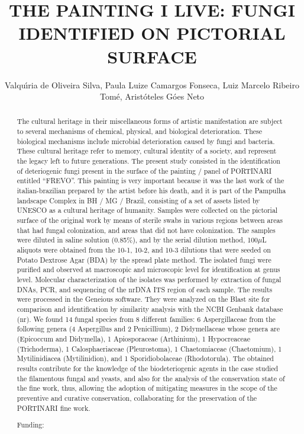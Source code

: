 \documentclass[twoside]{article}
\title{\vspace{-15mm}\fontsize{24pt}{10pt}\selectfont\textbf{ THE PAINTING I LIVE: FUNGI IDENTIFIED ON PICTORIAL SURFACE }} %
\author{ Valqu\'{\i}ria de Oliveira Silva, Paula Luize Camargos Fonseca, Luiz Marcelo Ribeiro Tom\'e, Arist\'oteles G\'oes Neto }
\affil{ Universidade Federal de Minas Gerais }
\date{}
\begin{document}
  
  
  \maketitle %
  
  
  \thispagestyle{fancy} %
  
  
  \begin{abstract}
  The cultural heritage in their miscellaneous  forms of artistic manifestation are subject to several mechanisms of chemical,  physical,  and biological deterioration. These biological mechanisms include microbial deterioration caused by fungi and bacteria. These cultural heritage refer to memory,  cultural identity of a society,  and represent the legacy left to future generations. The present study consisted in the identification of deteriogenic fungi present in the surface of the painting / panel of PORTINARI entitled “FREVO”. This painting is very important because it was the last work of the italian-brazilian prepared by the artist before his death,  and it is part of the Pampulha landscape Complex in BH / MG / Brazil,  consisting of a set of assets listed by UNESCO as a cultural heritage of humanity. Samples were collected on the pictorial surface of the original work by means of sterile swabs in various regions between areas that had fungal colonization,  and areas that did not have colonization. The samples were diluted in saline solution (0.85\%),  and by the serial dilution method,  100$\mu$L aliquots were obtained from the 10-1,  10-2,  and 10-3 dilutions that were seeded on Potato Dextrose Agar (BDA) by the spread plate method. The isolated fungi were purified and observed at macroscopic and microscopic level for identification at genus level. Molecular characterization of the isolates was performed by extraction of fungal DNAs,  PCR,  and sequencing of the nrDNA ITS region of each sample. The results were processed in the Geneious software. They were analyzed on the Blast site for comparison and identification by similarity analysis with the NCBI Genbank database (nr). We found 14 fungal species from 8 different families: 6 Aspergillaceae from the following genera (4 Aspergillus and 2 Penicillium),  2 Didymellaceae whose genera are (Epicoccum and Didymella),  1 Apiosporaceae (Arthinium),  1 Hypocreaceae (Trichoderma),  1 Calosphaeriaceae (Pleurostoma),  1 Chaetomiaceae (Chaetomium),  1 Mytilinidiacea (Mytilinidion),  and 1 Sporidiobolaceae (Rhodotorula). The obtained results contribute for the knowledge of the biodeteriogenic agents in the case studied the filamentous fungal and yeasts,  and also for the analysis of the conservation state of the fine work,  thus,  allowing the adoption of mitigating measures in the scope of the preventive and curative conservation,  collaborating for the preservation of the PORTINARI fine work.
  
  Funding:  \\ 
  \end{abstract}
  
\end{document}

